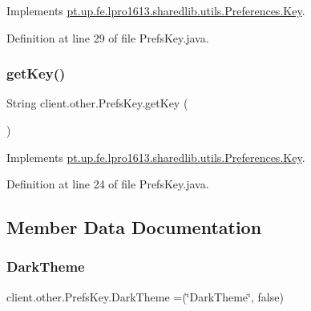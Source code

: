 Implements \hyperlink{interfacept_1_1up_1_1fe_1_1lpro1613_1_1sharedlib_1_1utils_1_1_preferences_1_1_key_aa78c759626a4e04578befd149e4c7310}{pt.\+up.\+fe.\+lpro1613.\+sharedlib.\+utils.\+Preferences.\+Key}.



Definition at line 29 of file Prefs\+Key.\+java.

\hypertarget{enumclient_1_1other_1_1_prefs_key_a204beaf7ef2607c5ee052bf712d5fc66}{}\label{enumclient_1_1other_1_1_prefs_key_a204beaf7ef2607c5ee052bf712d5fc66} 
\subsubsection{\texorpdfstring{get\+Key()}{getKey()}}
{\footnotesize\ttfamily String client.\+other.\+Prefs\+Key.\+get\+Key (\begin{DoxyParamCaption}{ }\end{DoxyParamCaption})}



Implements \hyperlink{interfacept_1_1up_1_1fe_1_1lpro1613_1_1sharedlib_1_1utils_1_1_preferences_1_1_key_af244cecb8edad1f87eaaa517c3590507}{pt.\+up.\+fe.\+lpro1613.\+sharedlib.\+utils.\+Preferences.\+Key}.



Definition at line 24 of file Prefs\+Key.\+java.



\subsection{Member Data Documentation}
\hypertarget{enumclient_1_1other_1_1_prefs_key_a1712884dcd2b70030aa4e9baadfc5d65}{}\label{enumclient_1_1other_1_1_prefs_key_a1712884dcd2b70030aa4e9baadfc5d65} 
\subsubsection{\texorpdfstring{Dark\+Theme}{DarkTheme}}
{\footnotesize\ttfamily client.\+other.\+Prefs\+Key.\+Dark\+Theme =(\char`\"{}Dark\+Theme\char`\"{}, false)}



